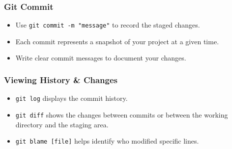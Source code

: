 \documentclass[10pt]{beamer}
\begin{document}
\begin{frame}
    \frametitle{Git Commit}
    \begin{itemize}
        \item Use \texttt{git commit -m "message"} to record the staged changes.
        \item Each commit represents a snapshot of your project at a given time.
        \item Write clear commit messages to document your changes.
    \end{itemize}
\end{frame}

\begin{frame}
    \frametitle{Viewing History \& Changes}
    \begin{itemize}
        \item \texttt{git log} displays the commit history.
        \item \texttt{git diff} shows the changes between commits or between the working directory and the staging area.
        \item \texttt{git blame [file]} helps identify who modified specific lines.
    \end{itemize}
\end{frame}
\end{document}
